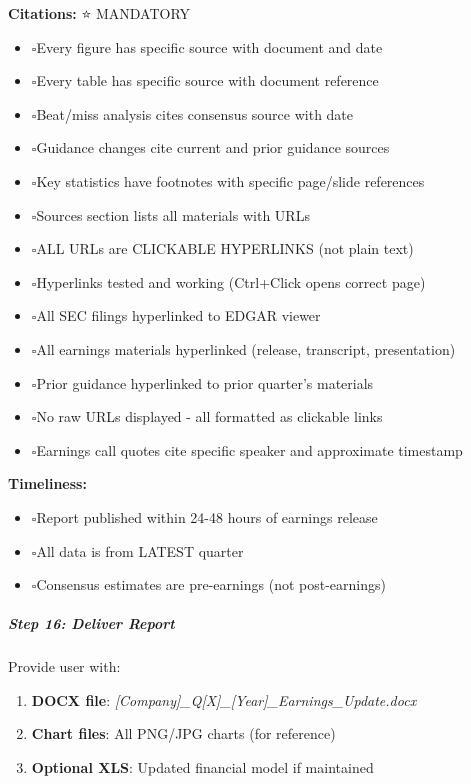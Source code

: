 \documentclass[11pt]{article}
\newcommand{\UncheckedBox}{$\square$}
\begin{document}
\textbf{Citations:} ⭐ MANDATORY

\begin{itemize}[leftmargin=*,itemsep=2pt,topsep=2pt]
\item {} \UncheckedBox Every figure has specific source with document and date
\item {} \UncheckedBox Every table has specific source with document reference
\item {} \UncheckedBox Beat/miss analysis cites consensus source with date
\item {} \UncheckedBox Guidance changes cite current and prior guidance sources
\item {} \UncheckedBox Key statistics have footnotes with specific page/slide references
\item {} \UncheckedBox Sources section lists all materials with URLs
\item {} \UncheckedBox ALL URLs are CLICKABLE HYPERLINKS (not plain text)
\item {} \UncheckedBox Hyperlinks tested and working (Ctrl+Click opens correct page)
\item {} \UncheckedBox All SEC filings hyperlinked to EDGAR viewer
\item {} \UncheckedBox All earnings materials hyperlinked (release, transcript, presentation)
\item {} \UncheckedBox Prior guidance hyperlinked to prior quarter's materials
\item {} \UncheckedBox No raw URLs displayed - all formatted as clickable links
\item {} \UncheckedBox Earnings call quotes cite specific speaker and approximate timestamp
\end{itemize}

\textbf{Timeliness:}

\begin{itemize}[leftmargin=*,itemsep=2pt,topsep=2pt]
\item {} \UncheckedBox Report published within 24-48 hours of earnings release
\item {} \UncheckedBox All data is from LATEST quarter
\item {} \UncheckedBox Consensus estimates are pre-earnings (not post-earnings)
\end{itemize}

\subparagraph{Step 16: Deliver Report}\mbox{}\par

Provide user with:


\begin{enumerate}[leftmargin=*,itemsep=2pt,topsep=2pt]
\item {} \textbf{DOCX file}: \emph{[Company]\_\allowbreak{}Q[X]\_\allowbreak{}[Year]\_\allowbreak{}Earnings\_\allowbreak{}Update.docx}
\item {} \textbf{Chart files}: All PNG/JPG charts (for reference)
\item {} \textbf{Optional XLS}: Updated financial model if maintained
\end{enumerate}
\end{document}
